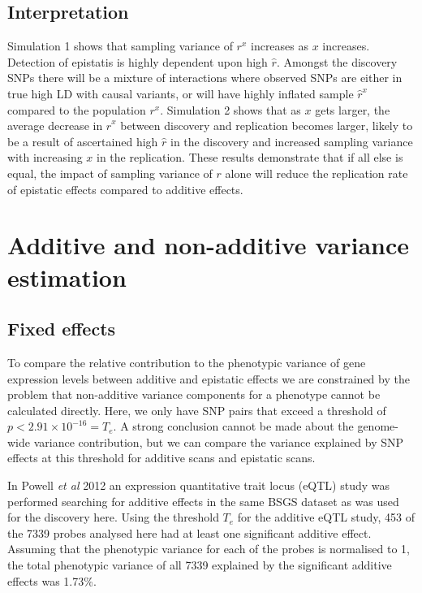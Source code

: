 \documentclass{article}
\begin{document}
\subsection{Interpretation}

Simulation 1 shows that sampling variance of $r^x$ increases as $x$ increases. Detection of epistatis is highly dependent upon high $\hat{r}$. Amongst the discovery SNPs there will be a mixture of interactions where observed SNPs are either in true high LD with causal variants, or will have highly inflated sample $\hat{r}^{x}$ compared to the population $r^x$. Simulation 2 shows that as $x$ gets larger, the average decrease in $\hat{r}^x$ between discovery and replication becomes larger, likely to be a result of ascertained high $\hat{r}$ in the discovery and increased sampling variance with increasing $x$ in the replication. These results demonstrate that if all else is equal, the impact of sampling variance of $r$ alone will reduce the replication rate of epistatic effects compared to additive effects.


\section{Additive and non-additive variance estimation}

\subsection{Fixed effects}

To compare the relative contribution to the phenotypic variance of gene expression levels between additive and epistatic effects we are constrained by the problem that non-additive variance components for a phenotype cannot be calculated directly. Here, we only have SNP pairs that exceed a threshold of $p < 2.91 \times 10^{-16} = T_{e}$. A strong conclusion cannot be made about the genome-wide variance contribution, but we can compare the variance explained by SNP effects at this threshold for additive scans and epistatic scans. 

In Powell \emph{et al} 2012 \cite{Powell2012} an expression quantitative trait locus (eQTL) study was performed searching for additive effects in the same BSGS dataset as was used for the discovery here. Using the threshold $T_{e}$ for the additive eQTL study, 453 of the 7339 probes analysed here had at least one significant additive effect. Assuming that the phenotypic variance for each of the probes is normalised to 1, the total phenotypic variance of all 7339 explained by the significant additive effects was 1.73\%.
\end{document}
